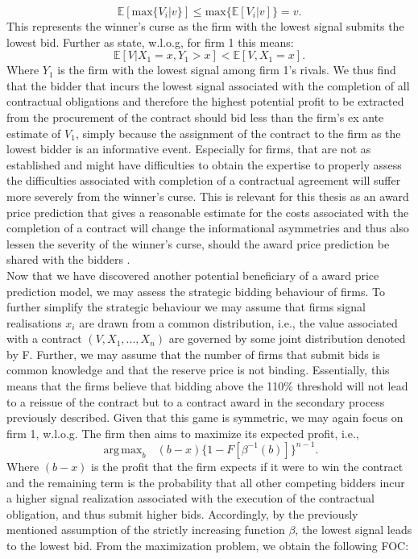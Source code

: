 \documentclass[a4paper,12pt, headsepline]{scrartcl}
\DeclareMathOperator*{\argmaxA}{arg\,max}
\numberwithin{equation}{section}
\begin{document}
\[
\mathbb{E}[\text{max}\{V_i|v\}] \leq \text{max}\{{\mathbb{E}[V_i|v]}\} = v.
\] 
This represents the winner's curse as the firm with the lowest signal submits the lowest bid. Further as \citet{milgrom82} state, w.l.o.g, for firm 1 this means:
\[
\mathbb{E}[V|X_1 = x, Y_1 > x] < \mathbb{E}[V, X_1 = x].
\]
Where $Y_1$ is the firm with the lowest signal among firm 1's rivals. We thus find that the bidder that incurs the lowest signal associated with the completion of all contractual obligations and therefore the highest potential profit to be extracted from the procurement of the contract should bid less than the firm's ex ante estimate of $V_1$, simply because the assignment of the contract to the firm as the lowest bidder is an informative event. Especially for firms, that are not as established and might have difficulties to obtain the expertise to properly assess the difficulties associated with completion of a contractual agreement will suffer more severely from the winner's curse. This is relevant for this thesis as an award price prediction that gives a reasonable estimate for the costs associated with the completion of a contract will change the informational asymmetries and thus also lessen the severity of the winner's curse, should the award price prediction be shared with the bidders \citep{GarciaRodriguez2020}.\\
Now that we have discovered another potential beneficiary of a award price prediction model, we may assess the strategic bidding behaviour of firms. To further simplify the strategic behaviour we may assume that firms signal realisations $x_i$ are drawn from a common distribution, i.e., the value associated with a contract $(V, X_1, ..., X_n)$ are governed by some joint distribution denoted by F. Further, we may assume that the number of firms that submit bids is common knowledge and that the reserve price is not binding. Essentially, this means that the firms believe that bidding above the 110\% threshold will not lead to a reissue of the contract but to a contract award in the secondary process previously described. Given that this game is symmetric, we may again focus on firm 1, w.l.o.g. The firm then aims to maximize its expected profit, i.e.,
\[
\argmaxA_b \text{ } (b - x)\{1 - F[\beta^{-1}(b)]\}^{n-1}.
\]
Where $(b - x)$ is the profit that the firm expects if it were to win the contract and the remaining term is the probability that all other competing bidders incur a higher signal realization associated with the execution of the contractual obligation, and thus submit higher bids. Accordingly, by the previously mentioned assumption of the strictly increasing function $\beta$, the lowest signal leads to the lowest bid. From the maximization problem, we obtain the following FOC:
\end{document}
